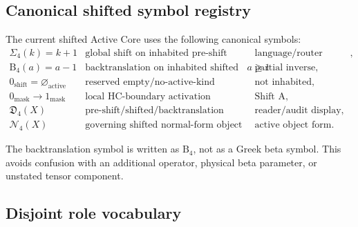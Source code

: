 \subsection{Canonical shifted symbol registry}
\label{subsec:v403-canonical-shifted-symbol-registry}

\begin{definition}
\label{def:v403-canonical-shifted-symbol-registry}
The current shifted Active Core uses the following canonical symbols:
\[
\begin{array}{lll}
\Sigma_4(k)=k+1
 & \text{global shift on inhabited pre-shift tags}
 & \text{language/router namespace},\\[0.2em]
\mathrm B_4(a)=a-1
 & \text{backtranslation on inhabited shifted tags }a\geq 1
 & \text{partial inverse},\\[0.2em]
0_{\mathrm{shift}}=\varnothing_{\mathrm{active}}
 & \text{reserved empty/no-active-kind marker}
 & \text{not inhabited},\\[0.2em]
0_{\mathrm{mask}}\to1_{\mathrm{mask}}
 & \text{local HC-boundary activation}
 & \text{Shift A},\\[0.2em]
\mathfrak D_4(X)
 & \text{pre-shift/shifted/backtranslation display triple}
 & \text{reader/audit display},\\[0.2em]
\mathcal N_4(X)
 & \text{governing shifted normal-form object}
 & \text{active object form}.
\end{array}
\]
\end{definition}

\begin{remark}
\label{rem:v403-roman-backtranslation-symbol}
The backtranslation symbol is written as $\mathrm B_4$, not as a Greek beta
symbol. This avoids confusion with an additional operator, physical beta
parameter, or unstated tensor component.
\end{remark}

\subsection{Disjoint role vocabulary}
\label{subsec:v403-disjoint-role-vocabulary}

